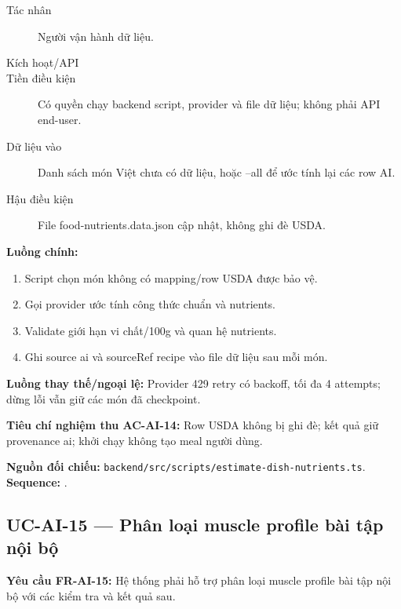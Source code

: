 \documentclass[12pt,a4paper]{article}
\newcommand{\evidence}[1]{{\small\nolinkurl{#1}}}
\begin{document}
\begin{description}
\item[Tác nhân] Người vận hành dữ liệu.
\item[Kích hoạt/API] 
\item[Tiền điều kiện] Có quyền chạy backend script, provider và file dữ liệu; không phải API end-user.
\item[Dữ liệu vào] Danh sách món Việt chưa có dữ liệu, hoặc --all để ước tính lại các row AI.
\item[Hậu điều kiện] File food-nutrients.data.json cập nhật, không ghi đè USDA.
\end{description}
\textbf{Luồng chính:}
\begin{enumerate}
  \item Script chọn món không có mapping/row USDA được bảo vệ.
  \item Gọi provider ước tính công thức chuẩn và nutrients.
  \item Validate giới hạn vi chất/100g và quan hệ nutrients.
  \item Ghi source ai và sourceRef recipe vào file dữ liệu sau mỗi món.
\end{enumerate}
\textbf{Luồng thay thế/ngoại lệ:} Provider 429 retry có backoff, tối đa 4 attempts; dừng lỗi vẫn giữ các món đã checkpoint.

\textbf{Tiêu chí nghiệm thu AC-AI-14:} Row USDA không bị ghi đè; kết quả giữ provenance ai; khởi chạy không tạo meal người dùng.

\textbf{Nguồn đối chiếu:} \evidence{backend/src/scripts/estimate-dish-nutrients.ts}. \textbf{Sequence:} .

\subsection{UC-AI-15 --- Phân loại muscle profile bài tập nội bộ}
\label{uc-ai-15}
\textbf{Yêu cầu FR-AI-15:} Hệ thống phải hỗ trợ phân loại muscle profile bài tập nội bộ với các kiểm tra và kết quả sau.
\end{document}
